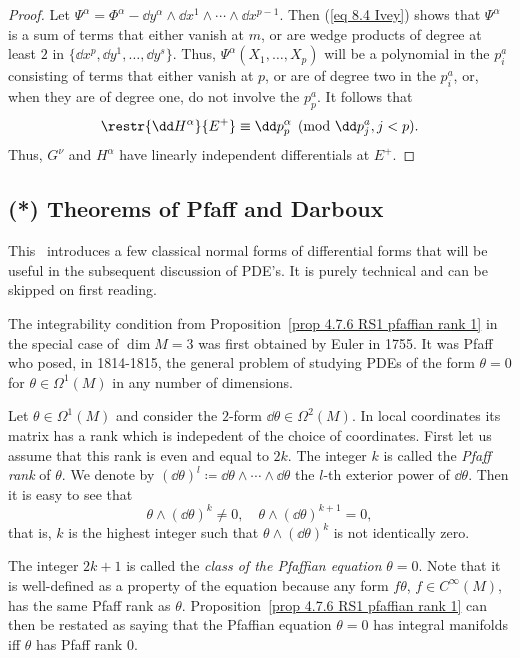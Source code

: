 \begin{proof}
    Let $\Psi^\alpha=\Phi^\alpha-\dd y^\alpha\wedge\dd x^1\wedge\cdots\wedge\dd x^{p-1}$. Then (\ref{eq 8.4 Ivey}) shows that $\Psi^\alpha$ is a sum of terms that either vanish at $m$, or are wedge products of degree at least $2$ in $\{\dd x^p,\dd y^1,\ldots,\dd y^s\}$. Thus, $\Psi^\alpha(X_1,\ldots,X_p)$ will be a polynomial in the $p^a_i$ consisting of terms that either vanish at $p$, or are of degree two in the $p^a_i$, or, when they are of degree one, do not involve the $p^a_p$. It follows that 
    \[\restr{\dd H^\alpha}{E^+}\equiv \dd p^\alpha_p \pmod{\dd p^a_j,j<p}.\]
    Thus, $G^\nu$ and $H^\alpha$ have linearly independent differentials at $E^+$.
\end{proof}











\subsection{(*) Theorems of Pfaff and Darboux}

This \subsect\ introduces a few classical normal forms of differential forms that will be useful in the subsequent discussion of PDE's. It is purely technical and can be skipped on first reading.

The integrability condition from Proposition~\ref{prop 4.7.6 RS1 pfaffian rank 1} in the special case of $\dim M=3$ was first obtained by Euler in 1755. It was Pfaff who posed, in 1814-1815, the general problem of studying PDEs of the form $\theta=0$ for $\theta\in\Omega^1(M)$ in any number of dimensions.

Let $\theta\in\Omega^1(M)$ and consider the $2$-form $\dd\theta\in\Omega^2(M)$. In local coordinates its matrix has a rank which is indepedent of the choice of coordinates. First let us assume that this rank is even and equal to $2k$. The integer $k$ is called the \emph{Pfaff rank} of $\theta$. We denote by $(\dd\theta)^l\coloneqq \dd\theta\wedge\cdots\wedge\dd\theta$ the $l$-th exterior power of $\dd\theta$. Then it is easy to see that 
\[\theta\wedge(\dd\theta)^{k}\neq 0,\quad \theta\wedge(\dd\theta)^{k+1}=0,\]
that is, $k$ is the highest integer such that $\theta\wedge(\dd\theta)^{k}$ is not identically zero. 

The integer $2k+1$ is called the \emph{class of the Pfaffian equation} $\theta=0$. Note that it is well-defined as a property of the equation because any form $f\theta$, $f\in C^\infty(M)$, has the same Pfaff rank as $\theta$. Proposition~\ref{prop 4.7.6 RS1 pfaffian rank 1} can then be restated as saying that the Pfaffian equation $\theta=0$ has integral manifolds iff $\theta$ has Pfaff rank $0$.

